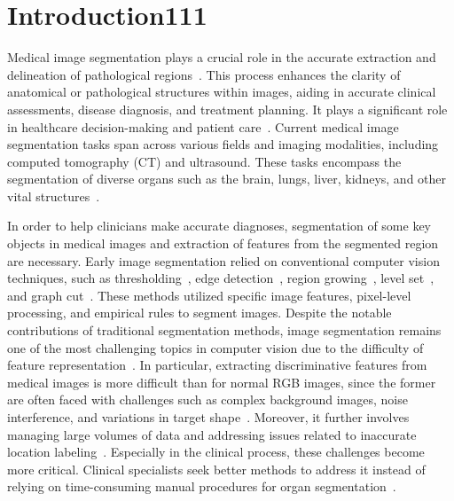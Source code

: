\documentclass[review]{elsarticle}
\begin{document}
	\section{Introduction111}
	Medical image segmentation plays a crucial role in the accurate extraction and delineation of pathological regions~\cite{iglesias2015multi}. This process enhances the clarity of anatomical or pathological structures within images, aiding in accurate clinical assessments, disease diagnosis, and treatment planning. It plays a significant role in healthcare decision-making and patient care~\cite{duncan2000Medical}. Current medical image segmentation tasks span across various fields and imaging modalities, including computed tomography (CT) and ultrasound. These tasks encompass the segmentation of diverse organs such as the brain, lungs, liver, kidneys, and other vital structures~\cite{shen2017deep,salpea2022medical,antonelli2022medical}.

	In order to help clinicians make accurate diagnoses, segmentation of some key objects in medical images and extraction of features from the segmented region are necessary. Early image segmentation relied on conventional computer vision techniques, such as thresholding~\cite{zhang2006adaptive, senthilkumaran2016image}, edge detection~\cite{chalana1997methodology,mehena2013medical}, region growing~\cite{justice1997medical}, level set~\cite{li2012new}, and graph cut~\cite{boykov2006graph,manoharan2020improved}. These methods utilized specific image features, pixel-level processing, and empirical rules to segment images. Despite the notable contributions of traditional segmentation methods, image segmentation remains one of the most challenging topics in computer vision due to the difficulty of feature representation~\cite{wang2022medical}. In particular, extracting discriminative features from medical images is more difficult than for normal RGB images, since the former are often faced with challenges such as complex background images, noise interference, and variations in target shape~\cite{pham2000current}. Moreover, it further involves managing large volumes of data and addressing issues related to inaccurate location labeling~\cite{hesamian2019deep,scholl2011challenges}. Especially in the clinical process, these challenges become more critical. Clinical specialists seek better methods to address it instead of relying on time-consuming manual procedures for organ segmentation~\cite{mccrindle2021radiology}.
\end{document}
